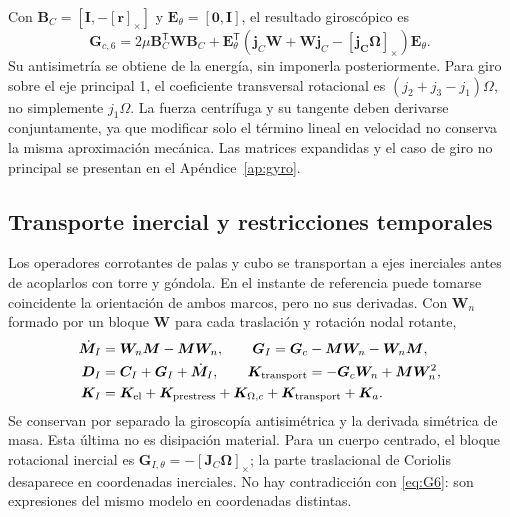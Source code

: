 \documentclass[oneside,a4paper,spanish,links,pagenumbers]{amca}
\newcommand{\Sx}[1]{[\bm{#1}]_\times}
\newcommand{\I}{\bm I}
\newcommand{\tr}{\mathsf T}
\begin{document}
Con $\bm B_C=[\I,-\Sx r]$ y $\bm E_\theta=[\bm0,\I]$, el resultado giroscópico es
\begin{equation}
 \boxed{\bm G_{c,6}=2\mu\bm B_C^\tr\bm W\bm B_C+
 \bm E_\theta^\tr(\bm j_C\bm W+\bm W\bm j_C-\Sx{j_C\Omega})\bm E_\theta.}
 \label{eq:G6}
\end{equation}
Su antisimetría se obtiene de la energía, sin imponerla posteriormente. Para giro sobre el eje principal 1, el coeficiente transversal rotacional es $(j_2+j_3-j_1)\Omega$, no simplemente $j_1\Omega$. La fuerza centrífuga y su tangente deben derivarse conjuntamente, ya que modificar solo el término lineal en velocidad no conserva la misma aproximación mecánica. Las matrices expandidas y el caso de giro no principal se presentan en el Apéndice~\ref{ap:gyro}.

\subsection{Transporte inercial y restricciones temporales}
\label{sec:mapas}
Los operadores corrotantes de palas y cubo se transportan a ejes inerciales antes de acoplarlos con torre y góndola. En el instante de referencia puede tomarse coincidente la orientación de ambos marcos, pero no sus derivadas. Con $\bm W_n$ formado por un bloque $\bm W$ para cada traslación y rotación nodal rotante,
\begin{align}
 \dot{\bm M}_I&=\bm W_n\bm M-\bm M\bm W_n,\qquad
 \bm G_I=\bm G_c-\bm M\bm W_n-\bm W_n\bm M,\\
 \bm D_I&=\bm C_I+\bm G_I+\dot{\bm M}_I,\qquad
 \bm K_{\rm transport}=-\bm G_c\bm W_n+\bm M\bm W_n^2,\\
 \bm K_I&=\bm K_{\rm el}+\bm K_{\rm prestress}
 +\bm K_{\Omega,c}+\bm K_{\rm transport}+\bm K_a.
 \label{eq:transport}
\end{align}
Se conservan por separado la giroscopía antisimétrica y la derivada simétrica de masa. Esta última no es disipación material. Para un cuerpo centrado, el bloque rotacional inercial es $\bm G_{I,\theta}=-[\bm J_C\bm\Omega]_\times$; la parte traslacional de Coriolis desaparece en coordenadas inerciales. No hay contradicción con \eqref{eq:G6}: son expresiones del mismo modelo en coordenadas distintas.
\end{document}
